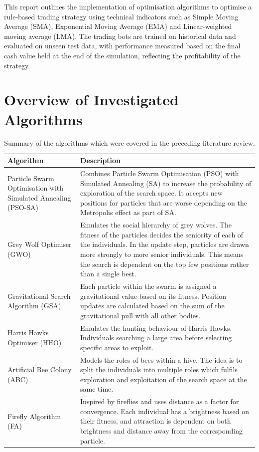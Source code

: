 \documentclass[a4paper, 12pt]{extarticle}
\begin{document}
This report outlines the implementation of optimisation algorithms to optimise a rule-based trading strategy using technical indicators such as Simple Moving Average (SMA), Exponential Moving Average (EMA) and Linear-weighted moving average (LMA). The trading bots are trained on historical data and evaluated on unseen test data, with performance measured based on the final cash value held at the end of the simulation, reflecting the profitability of the strategy. 

\newpage

\section{Overview of Investigated Algorithms}

\begin{table}[H]
    \centering
    \begin{tabularx}{\textwidth}{X X}
      \toprule
      \textbf{Algorithm} & \textbf{Description}\\
      \midrule
      Particle Swarm Optimisation with Simulated Annealing (PSO-SA) \cite{psosa} & Combines Particle Swarm Optimisation (PSO) \cite{pso} with Simulated Annealing (SA) to increase the probability of exploration of the search space. It accepts new positions for particles that are worse depending on the Metropolis effect as part of SA. \\
      Grey Wolf Optimiser (GWO) \cite{wolf} & Emulates the social hierarchy of grey wolves. The fitness of the particles decides the seniority of each of the individuals. In the update step, particles are drawn more strongly to more senior individuals. This means the search is dependent on the top few positions rather than a single best.\\
      Gravitational Search Algorithm (GSA) \cite{GSA} & Each particle within the swarm is assigned a gravitational value based on its fitness. Position updates are calculated based on the sum of the gravitational pull with all other bodies.\\
      Harris Hawks Optimiser (HHO) \cite{hawks} & Emulates the hunting behaviour of Harris Hawks. Individuals searching a large area before selecting specific areas to exploit.\\
      Artificial Bee Colony (ABC) \cite{abc} & Models the roles of bees within a hive. The idea is to split the individuals into multiple roles which fulfils exploration and exploitation of the search space at the same time.\\
      Firefly Algorithm (FA) \cite{firefly}& Inspired by fireflies and uses distance as a factor for convergence. Each individual has a brightness based on their fitness, and attraction is dependent on both brightness and distance away from the corresponding particle.\\ 
      \bottomrule
    \end{tabularx}
    \caption{Summary of the algorithms which were covered in the preceding literature review.}
    \label{tab:algorithms}
  \end{table}
\end{document}
